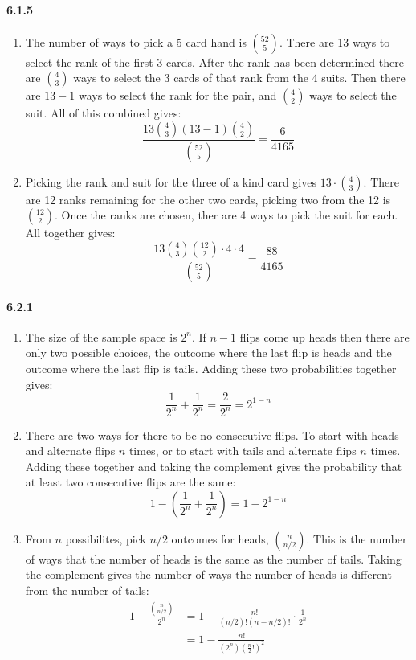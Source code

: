 \documentclass[11pt, letterpaper, twocolumn, fleqn]{article}
\begin{document}
\paragraph{6.1.5}
\begin{enumerate}
  \item The number of ways to pick a 5 card hand is $\binom{52}{5}$. There are 13 ways to select the rank of the first 3 cards. After the rank has been determined there are $\binom{4}{3}$ ways to select the 3 cards of that rank from the 4 suits. Then there are $13-1$ ways to select the rank for the pair, and $\binom{4}{2}$ ways to select the suit. All of this combined gives:
    $$\frac{13\binom{4}{3}(13-1)\binom{4}{2}}{\binom{52}{5}} = \frac{6}{4165}$$
    
  \item Picking the rank and suit for the three of a kind card gives $13 \cdot \binom{4}{3}$. There are 12 ranks remaining for the other two cards, picking two from the 12 is $\binom{12}{2}$. Once the ranks are chosen, ther are 4 ways to pick the suit for each. All together gives:
    $$\frac{13 \binom{4}{3} \binom{12}{2} \cdot 4 \cdot 4}{\binom{52}{5}} = \frac{88}{4165}$$
\end{enumerate}

\paragraph{6.2.1}
\begin{enumerate}
  \item The size of the sample space is $2^n$. If $n-1$ flips come up heads then there are only two possible choices, the outcome where the last flip is heads and the outcome where the last flip is tails. Adding these two probabilities together gives:
    $$\frac{1}{2^n} + \frac{1}{2^n} = \frac{2}{2^n} = 2^{1-n}$$
  
  \item There are two ways for there to be no consecutive flips. To start with heads and alternate flips $n$ times, or to start with tails and alternate flips $n$ times. Adding these together and taking the complement gives the probability that at least two consecutive flips are the same:
    $$1 - \left(\frac{1}{2^n}+\frac{1}{2^n}\right) = 1 - 2^{1-n}$$
    
  \item From $n$ possibilites, pick $n/2$ outcomes for heads, $\binom{n}{n/2}$. This is the number of ways that the number of heads is the same as the number of tails.  Taking the complement gives the number of ways the number of heads is different from the number of tails:
  \begin{align*}
    1-\frac{\binom{n}{n/2}}{2^n} &= 1- \frac{n!}{(n/2)!(n-n/2)!} \cdot \frac{1}{2^n}\\
    &= 1-\frac{n!}{(2^n)(\frac{n}{2}!)^2}
  \end{align*}
\end{enumerate}
\end{document}
